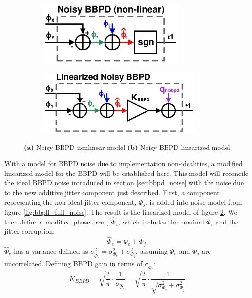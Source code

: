 	\begin{figure}[htb!]
	    \centering
	    \begin{subfigure}{0.5\textwidth}
	        \centering
	        \includegraphics[width=0.8\textwidth, angle=0]{figs/design/bbpd_noise_nonlinear}
	        \caption{ }
	        \label{fig:bbpd_noise_nonlinear}
	    \end{subfigure}%
	    \begin{subfigure}{0.5\textwidth}
	        \centering
	        \includegraphics[width=0.9\textwidth, angle=0]{figs/design/bbpd_noise_linear}
	        \caption{ }
	        \label{fig:bbpd_noise_linear}
	    \end{subfigure}
	    \caption{\textbf{(a)} Noisy BBPD nonlinear model \textbf{(b)} Noisy BBPD linearized model}
	     \label{fig:bbpd_noisy}
	\end{figure} 

	With a model for BBPD noise due to implementation non-idealities, a modified linearized model for the BBPD will be established here. This model will reconcile the ideal BBPD noise introduced in section \ref{sec:bbpd_noise} with the noise due to the new additive jitter component just described. First, a component representing the non-ideal jitter component, $\Phi_j$, is added into noise model from figure \ref{fig:bbpll_full_noise}. The result is the linearized model of figure \ref{fig:bbpd_noise_linear}. We then define a modified phase error, $\hat{\Phi}_e$, which includes the nominal $\Phi_e$ and the jitter corruption:
	\begin{equation}
	\hat{\Phi}_e = \Phi_e + \Phi_j.
	\end{equation}
	$\hat{\Phi}_e$ has a variance defined as $\sigma_{\hat{\Phi}_e}^2 = \sigma_{\Phi_e}^2 + \sigma_{\Phi_j}^2$, assuming $\Phi_e$ and $\Phi_j$ are uncorrelated. Defining BBPD gain in terms of $\sigma_{\hat{\Phi}_e}$:
	\begin{equation}
		K_{BBPD} = \sqrt{\frac{2}{\pi}}\cdot\frac{1}{\sigma_{\hat{\Phi}_e}} = \sqrt{\frac{2}{\pi}}\cdot\frac{1}{\sqrt{\sigma_{\Phi_e}^2 + \sigma_{\Phi_j}^2}}
	\end{equation}

